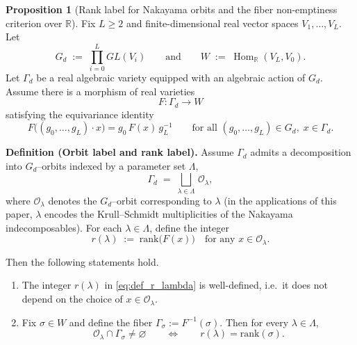 \documentclass{article}
\newcommand{\Hom}{\operatorname{Hom}}
\theoremstyle{definition}
\newtheorem{proposition}[theorem]{Proposition}
\begin{document}
\begin{proposition}[Rank label for Nakayama orbits and the fiber non-emptiness criterion over $\mathbb{R}$]
\label{prop:rank_label_and_nonemptiness_real}
Fix $L\ge 2$ and finite-dimensional real vector spaces $V_1,\dots,V_L$.
Let
\[
G_d \;:=\; \prod_{i=0}^L GL(V_i)
\qquad\text{and}\qquad
W \;:=\; \Hom_{\mathbb{R}}(V_L,V_0).
\]
Let $\Gamma_d$ be a real algebraic variety equipped with an algebraic action of $G_d$.
Assume there is a morphism of real varieties
\[
F:\Gamma_d \longrightarrow W
\]
satisfying the equivariance identity
\begin{equation}
\label{eq:equivariance_F}
F\!\big((g_0,\dots,g_L)\cdot x\big)=g_0\,F(x)\,g_L^{-1}
\qquad\text{for all } (g_0,\dots,g_L)\in G_d,\; x\in \Gamma_d .
\end{equation}

\medskip
\noindent
\textbf{Definition (Orbit label and rank label).}
Assume $\Gamma_d$ admits a decomposition into $G_d$--orbits indexed by a parameter set $\Lambda$,
\[
\Gamma_d \;=\; \bigsqcup_{\lambda\in\Lambda}\, \mathcal O_\lambda,
\]
where $\mathcal O_\lambda$ denotes the $G_d$--orbit corresponding to $\lambda$ (in the applications of this paper, $\lambda$ encodes the Krull--Schmidt multiplicities of the Nakayama indecomposables).  
For each $\lambda\in\Lambda$, define the integer
\begin{equation}
\label{eq:def_r_lambda}
r(\lambda) \;:=\; \mathrm{rank}\big(F(x)\big)\quad \text{for any } x\in \mathcal O_\lambda.
\end{equation}

\medskip
\noindent
Then the following statements hold.

\begin{enumerate}
\item[(i)] The integer $r(\lambda)$ in \eqref{eq:def_r_lambda} is well-defined, i.e.\ it does not depend on the choice of $x\in \mathcal O_\lambda$.
\item[(ii)] Fix $\sigma\in W$ and define the fiber $\Gamma_\sigma:=F^{-1}(\sigma)$. Then for every $\lambda\in\Lambda$,
\begin{equation}
\label{eq:nonemptiness}
\mathcal O_\lambda\cap \Gamma_\sigma \neq \varnothing
\qquad\Longleftrightarrow\qquad
r(\lambda)=\mathrm{rank}(\sigma).
\end{equation}
\end{enumerate}
\end{proposition}
\end{document}
